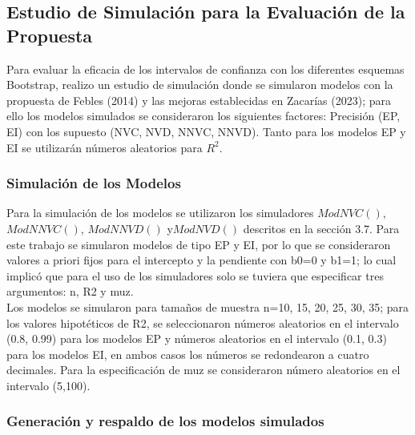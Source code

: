 	 
\subsection{Estudio de Simulación para la Evaluación de la Propuesta}

Para evaluar la eficacia de los intervalos de confianza con los diferentes esquemas Bootstrap, realizo un estudio de simulación donde se simularon modelos con la propuesta de Febles (2014) y las mejoras establecidas en Zacarías (2023); para ello los modelos simulados se consideraron los siguientes factores: Precisión (EP, EI) con los supuesto (NVC, NVD, NNVC, NNVD). Tanto para los modelos EP y EI se utilizarán números aleatorios para $R^{2}$.



\subsubsection{Simulación de los Modelos}
Para la simulación de los modelos se utilizaron los simuladores $ModNVC()$, $ModNNVC()$, $ModNNVD()$ y$ ModNVD()$ descritos en la sección 3.7. Para este trabajo se simularon modelos de tipo EP y EI, por lo que se consideraron valores a priori fijos para el intercepto y la pendiente con b0=0 y b1=1; lo cual implicó que para el uso de los simuladores solo se tuviera que especificar tres argumentos: n, R2 y muz.\\

Los modelos se simularon para tamaños de muestra n=10, 15, 20, 25, 30, 35; para los valores hipotéticos de R2, se seleccionaron números aleatorios en el intervalo (0.8, 0.99) para los modelos EP y números aleatorios en el intervalo (0.1, 0.3) para los modelos EI, en ambos casos los números se redondearon a cuatro decimales. Para la especificación de muz se consideraron número aleatorios en el intervalo (5,100).\\
 

\subsubsection{Generación y respaldo de los modelos simulados}

